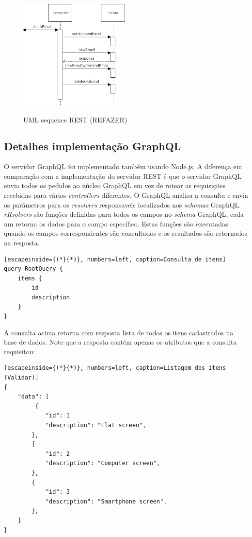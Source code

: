 \begin{figure}[htbp]
\centering
\includegraphics[width=0.5\textwidth]{figuras/uml-sequence.png}
\label{fig:rest-uml}
\caption{UML sequence REST (REFAZER)}
\author{fonte: Autor}
\end{figure}
\pagebreak

\subsection{Detalhes implementação GraphQL}

O servidor GraphQL foi implementado também usando Node.js. A diferença em comparação com a implementação do servidor REST é que o servidor GraphQL envia todos os pedidos ao núcleo GraphQL em vez de rotear as requisições recebidas para vários \textit{controllers} diferentes. O GraphQL analisa a consulta e envia os parâmetros para os \textit{resolvers} responsaveis localizados nos \textit{schemas} GraphQL. \textit{rRsolvers} são funções definidas para todos os campos no \textit{schema} GraphQL, cada um retorna os dados para o campo específico. Estas funções são executadas quando os campos correspondentes são consultados e os resultados são retornados na resposta.

\begin{lstlisting}[escapeinside={(*}{*)}, numbers=left, caption=Consulta de itens]
query RootQuery {
	items {
    	id
    	description
    }
}

\end{lstlisting}

A consulta acima retorna com resposta lista de todos os itens cadastrados na base de dados. Note que a resposta contém apenas os atributos que a consulta requisitou: 

\begin{lstlisting}[escapeinside={(*}{*)}, numbers=left, caption=Listagem dos itens (Validar)]
{
    "data": [
         {
        	"id": 1
            "description": "Flat screen",
        },
        {
        	"id": 2
            "description": "Computer screen",
        },
        {
        	"id": 3
            "description": "Smartphone screen",
        },
    ]
}

\end{lstlisting}

